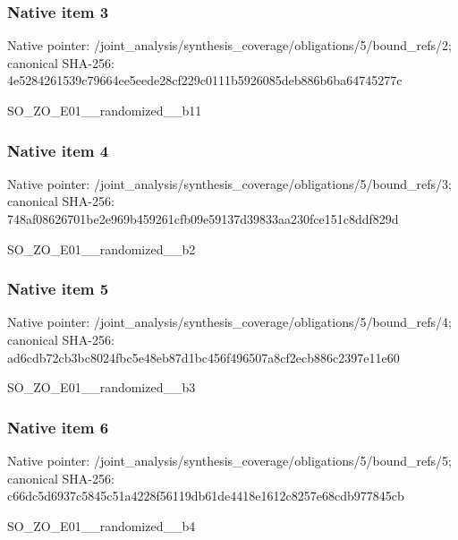 \documentclass[10pt,a4paper]{article}
\begin{document}
\subsubsection{Native item 3}
Native pointer: /joint\_\allowbreak{}analysis/synthesis\_\allowbreak{}coverage/obligations/5/bound\_\allowbreak{}refs/2; canonical SHA-256: 4e5284261539c79664ee5eede28cf229c0111b5926085deb886b6ba64745277c

\begingroup\raggedright\sloppy SO\_\allowbreak{}ZO\_\allowbreak{}E01\_\allowbreak{}\_\allowbreak{}randomized\_\allowbreak{}\_\allowbreak{}b11\par\endgroup

\subsubsection{Native item 4}
Native pointer: /joint\_\allowbreak{}analysis/synthesis\_\allowbreak{}coverage/obligations/5/bound\_\allowbreak{}refs/3; canonical SHA-256: 748af08626701be2e969b459261cfb09e59137d39833aa230fce151c8ddf829d

\begingroup\raggedright\sloppy SO\_\allowbreak{}ZO\_\allowbreak{}E01\_\allowbreak{}\_\allowbreak{}randomized\_\allowbreak{}\_\allowbreak{}b2\par\endgroup

\subsubsection{Native item 5}
Native pointer: /joint\_\allowbreak{}analysis/synthesis\_\allowbreak{}coverage/obligations/5/bound\_\allowbreak{}refs/4; canonical SHA-256: ad6cdb72cb3bc8024fbc5e48eb87d1bc456f496507a8cf2ecb886c2397e11e60

\begingroup\raggedright\sloppy SO\_\allowbreak{}ZO\_\allowbreak{}E01\_\allowbreak{}\_\allowbreak{}randomized\_\allowbreak{}\_\allowbreak{}b3\par\endgroup

\subsubsection{Native item 6}
Native pointer: /joint\_\allowbreak{}analysis/synthesis\_\allowbreak{}coverage/obligations/5/bound\_\allowbreak{}refs/5; canonical SHA-256: c66dc5d6937c5845c51a4228f56119db61de4418e1612c8257e68cdb977845cb

\begingroup\raggedright\sloppy SO\_\allowbreak{}ZO\_\allowbreak{}E01\_\allowbreak{}\_\allowbreak{}randomized\_\allowbreak{}\_\allowbreak{}b4\par\endgroup
\end{document}
